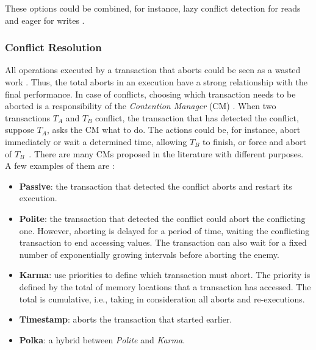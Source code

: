 These options could be combined, for instance, lazy conflict detection for reads and eager for writes \cite{Bandeira:2015}.

\subsubsection{Conflict Resolution}\label{sec:contetionManager}

All operations executed by a transaction that aborts could be seen as a wasted work \cite{Spear:2009, Ansari:2009:PTM, Zhou:2016}. Thus, the total aborts in an execution have a strong relationship with the final performance. In case of conflicts, choosing which transaction needs to be aborted is a responsibility of the \emph{Contention Manager} (CM) \cite{Yoo:2008}. When two transactions $T_A$ and $T_B$ conflict, the transaction that has detected the conflict, suppose $T_A$, asks  the CM what to do. The actions could be, for instance, abort immediately or wait a determined time, allowing $T_B$ to finish, or force and abort of $T_B$~\cite{Guerraoui:2006}. 
There are many CMs proposed in the literature with different purposes. A few examples of them are \cite{Scherer:2005, Spear:2009, Harris:2010, Grahn:2010}: 
\begin{itemize}
	\item \textbf{Passive}: the transaction that detected the conflict aborts and restart its execution.
	
	\item \textbf{Polite}: the transaction that detected the conflict could abort the conflicting one. However,  aborting is delayed for a period of time, waiting the conflicting transaction to end accessing values. The transaction can also wait for a fixed number of exponentially growing intervals
	before aborting the enemy.
	
	\item \textbf{Karma}: use priorities to define which transaction must abort. The priority is defined by the total of memory locations that a transaction has accessed. The total is cumulative, i.e., taking in consideration all aborts and re-executions.
	
	\item \textbf{Timestamp}: aborts the transaction that started earlier.
	
	\item \textbf{Polka}: a hybrid between \textit{Polite} and \textit{Karma}.
\end{itemize}

